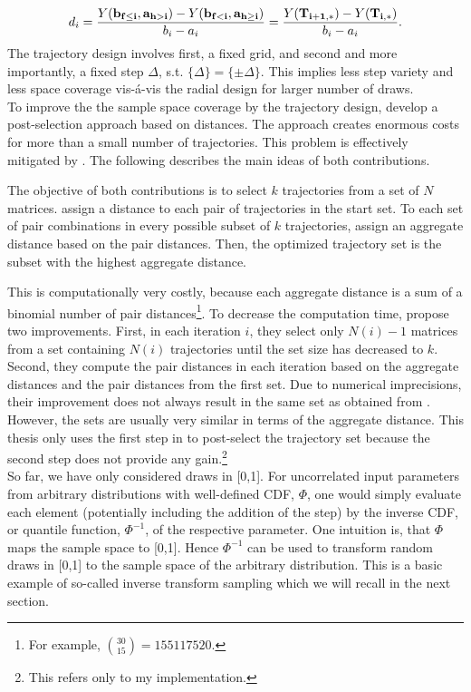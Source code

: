 \documentclass[a4paper,12pt]{article}
\begin{document}
\begin{align} \label{eq:traj}
d_i =  \frac{Y(\bold{b_{f \leq i}}, \bold{a_{h>i}}) - Y(\bold{b_{f<i}}, \bold{a_{h \geq i}})}{b_i - a_i} = \frac{Y(\bold{T_{i+1,*})} -  Y(\bold{T_{i,*}})}{b_i - a_i}.
\end{align}
The trajectory design involves first, a fixed grid, and second and more importantly, a fixed step $\Delta$, s.t. $\{\Delta\} = \{\pm \Delta\}$. This implies less step variety and less space coverage vis-á-vis the radial design for larger number of draws.\\

\noindent
To improve the the sample space coverage by the trajectory design, \cite{campolongo2007effective} develop a post-selection approach based on distances. The approach creates enormous costs for more than a small number of trajectories. This problem is effectively mitigated by \cite{ge2014efficient}. The following describes the main ideas of both contributions.

The objective of both contributions is to select $k$ trajectories from a set of $N$ matrices. \cite{campolongo2007effective} assign a distance to each pair of trajectories in the start set. To each set of pair combinations in every possible subset of $k$ trajectories, \citeauthor{campolongo2007effective} assign an aggregate distance based on the pair distances. Then, the optimized trajectory set is the subset with the highest aggregate distance.

This is computationally very costly, because each aggregate distance is a sum of a binomial number of pair distances\footnote{For example, $\binom{30}{15} = 155117520$.}. To decrease the computation time, \cite{ge2014efficient} propose two improvements. First, in each iteration $i$, they select only $N(i)-1$ matrices from a set containing $N(i)$ trajectories until the set size has decreased to $k$. Second, they compute the pair distances in each iteration based on the aggregate distances and the pair distances from the first set. Due to numerical imprecisions, their improvement does not always result in the same set as obtained from \cite{campolongo2007effective}. However, the sets are usually very similar in terms of the aggregate distance. This thesis only uses the first step in \cite{ge2014efficient} to post-select the trajectory set because the second step does not provide any gain.\footnote{This refers only to my implementation.}\\


\noindent
So far, we have only considered draws in [0,1]. For uncorrelated input parameters from arbitrary distributions with well-defined CDF, $\Phi$, one would simply evaluate each element (potentially including the addition of the step) by the inverse CDF, or quantile function, $\Phi^{-1}$, of the respective parameter. One intuition is, that $\Phi$ maps the sample space to [0,1]. Hence $\Phi^{-1}$ can be used to transform random draws in [0,1] to the sample space of the arbitrary distribution. This is a basic example of so-called inverse transform sampling which we will recall in the next section.
\end{document}
